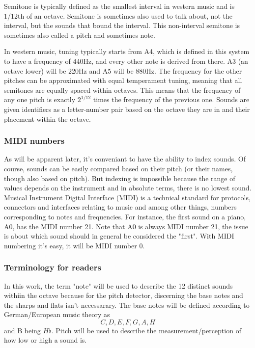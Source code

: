 Semitone is typically defined as the smallest interval in western music and is 1/12th of an octave. Semitone is sometimes also used to talk about, not the interval, but the sounds that bound the interval. This non-interval semitone is sometimes also called a pitch and sometimes note.

In western music, tuning typically starts from A4, which is defined in this system to have a frequency of 440Hz, and every other note is derived from there. A3 (an octave lower) will be 220Hz and A5 will be 880Hz. The frequency for the other pitches can be approximated with equal temperament tuning, meaning that all semitones are equally spaced within octaves. This means that the frequency of any one pitch is exactly $2^{1/12}$ times the frequency of the previous one. Sounds are given identifiers as a letter-number pair based on the octave they are in and their placement within the octave. 

\subsubsection{MIDI numbers}
As will be apparent later, it's conveniant to have the ability to index sounds. Of course, sounds can be easily compared based on their pitch (or their names, though also based on pitch). But indexing is impossible because the range of values depends on the instrument and in absolute terms, there is no lowest sound.  
Musical Instrument Digital Interface (MIDI) is a technical standard for protocols, connectors and interfaces relating to music and among other things, numbers corresponding to notes and frequencies. For instance, the first sound on a piano, A0, has the MIDI number 21. Note that A0 is always MIDI number 21, the issue is about which sound should in general be considered the "first". With MIDI numbering it's easy, it will be MIDI number 0. 

\subsubsection{Terminology for readers}
In this work, the term "note" will be used to describe the 12 distinct sounds withiin the octave because for the pitch detector, discerning the base notes and the sharps and flats isn't necessarary. The base notes will be defined according to German/European music theory as \[C, D, E, F, G, A, H\] and B being $H\flat$. Pitch will be used to describe the measurement/perception of how low or high a sound is. 

